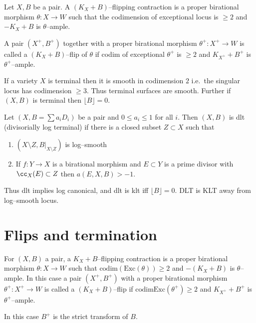 \begin{definition}
    Let \(X,B\) be a pair. A \((K_X+B)\)--flipping contraction is a proper
    birational morphism \(\theta:X\to W\) such that the codimension of
    exceptional locus is \(\geq 2\) and \(-K_X+B\) is \(\theta\)--ample.

    A pair \((X^+,B^+)\) together with a proper birational morphism
    \(\theta^+:X^+\to W\) is called a \((K_X+B)\)--flip of \(\theta\) if codim
    of exceptional \(\theta^+\) is \(\geq 2\) and \(K_{X^+}+B^+\) is
    \(\theta^+\)--ample.
\end{definition}

\begin{remark}
    If a variety \(X\) is terminal then it is smooth in codimension \(2\) i.e.\
    the singular locus has codimension \(\geq 3\). Thus terminal surfaces are
    smooth. Further if \((X,B)\) is terminal then \(\lfloor B \rfloor = 0\).
\end{remark}

\begin{definition}
    Let \((X,B=\sum a_i D_i)\) be a pair and \(0\leq a_i \leq 1\) for all \(i\).
    Then \((X,B)\) is dlt (divisorially log terminal) if there is a closed
    subset \(Z\subset X\) such that
    \begin{enumerate}
        \item \((X\setminus Z, B|_{X\setminus Z})\) is log--smooth
        \item If \(f:Y\to X\) is a birational morphism and \(E\subset Y\) is a
            prime divisor with \(\cc_X(E)\subset Z\) then \(a(E,X,B)>-1\).
    \end{enumerate}
\end{definition}

Thus dlt implies log canonical, and dlt is klt iff \(\lfloor B \rfloor = 0\).
DLT is KLT away from log--smooth locus.

\section{Flips and termination}
\begin{definition}
    For \((X,B)\) a pair, a \(K_X+B\)--flipping contraction is a proper
    birational morphism \(\theta:X\to W\) such that
    \(\text{codim}(\text{Exc}(\theta))\geq 2\) and \(-(K_X+B)\) is
    \(\theta\)--ample. In this case a pair \((X^+, B^+)\) with a proper
    birational morphism \(\theta^+:X^+\to W\) is called a \((K_X+B)\)--flip if
    \(\text{codim}\text{Exc}(\theta^+)\geq 2\) and \(K_{X^+}+B^+\) is
    \(\theta^+\)--ample.

    In this case \(B^+\) is the strict transform of \(B\).
\end{definition}


